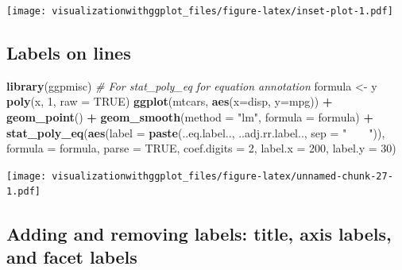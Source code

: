 \documentclass[]{krantz}
\makeatletter
\newenvironment{Shaded}{\begin{snugshade}}{\end{snugshade}}
\newcommand{\CommentTok}[1]{\textcolor[rgb]{0.56,0.35,0.01}{\textit{#1}}}
\newcommand{\DataTypeTok}[1]{\textcolor[rgb]{0.13,0.29,0.53}{#1}}
\newcommand{\DecValTok}[1]{\textcolor[rgb]{0.00,0.00,0.81}{#1}}
\newcommand{\KeywordTok}[1]{\textcolor[rgb]{0.13,0.29,0.53}{\textbf{#1}}}
\newcommand{\NormalTok}[1]{#1}
\newcommand{\OperatorTok}[1]{\textcolor[rgb]{0.81,0.36,0.00}{\textbf{#1}}}
\newcommand{\OtherTok}[1]{\textcolor[rgb]{0.56,0.35,0.01}{#1}}
\newcommand{\StringTok}[1]{\textcolor[rgb]{0.31,0.60,0.02}{#1}}
\newenvironment{kframe}{%
\medskip{}
\setlength{\fboxsep}{.8em}
 \def\at@end@of@kframe{}%
 \ifinner\ifhmode%
  \def\at@end@of@kframe{\end{minipage}}%
  \begin{minipage}{\columnwidth}%
 \fi\fi%
 \def\FrameCommand##1{\hskip\@totalleftmargin \hskip-\fboxsep
 \colorbox{shadecolor}{##1}\hskip-\fboxsep
     \hskip-\linewidth \hskip-\@totalleftmargin \hskip\columnwidth}%
 \MakeFramed {\advance\hsize-\width
   \@totalleftmargin\z@ \linewidth\hsize
   \@setminipage}}%
 {\par\unskip\endMakeFramed%
 \at@end@of@kframe}
\renewenvironment{Shaded}{\begin{kframe}}{\end{kframe}}
\makeatother
\begin{document}
\texttt{[image: visualizationwithggplot\_files/figure-latex/inset-plot-1.pdf]}

\hypertarget{labels-on-lines}{%
\subsection{Labels on lines}\label{labels-on-lines}}

\begin{Shaded}
\begin{Highlighting}[]
\KeywordTok{library}\NormalTok{(ggpmisc) }\CommentTok{# For stat_poly_eq for equation annotation  }
\NormalTok{formula <-}\StringTok{ }\NormalTok{y }\OperatorTok{~}\StringTok{ }\KeywordTok{poly}\NormalTok{(x, }\DecValTok{1}\NormalTok{, }\DataTypeTok{raw =} \OtherTok{TRUE}\NormalTok{)}
\KeywordTok{ggplot}\NormalTok{(mtcars, }\KeywordTok{aes}\NormalTok{(}\DataTypeTok{x=}\NormalTok{disp, }\DataTypeTok{y=}\NormalTok{mpg)) }\OperatorTok{+}\StringTok{ }
\StringTok{    }\KeywordTok{geom_point}\NormalTok{() }\OperatorTok{+}\StringTok{  }
\StringTok{    }\KeywordTok{geom_smooth}\NormalTok{(}\DataTypeTok{method =} \StringTok{"lm"}\NormalTok{, }\DataTypeTok{formula =}\NormalTok{ formula) }\OperatorTok{+}\StringTok{     }\KeywordTok{stat_poly_eq}\NormalTok{(}\KeywordTok{aes}\NormalTok{(}\DataTypeTok{label =}  \KeywordTok{paste}\NormalTok{(..eq.label.., ..adj.rr.label.., }
        \DataTypeTok{sep =} \StringTok{"~~~~"}\NormalTok{)), }\DataTypeTok{formula =}\NormalTok{ formula, }\DataTypeTok{parse =} \OtherTok{TRUE}\NormalTok{, }\DataTypeTok{coef.digits =} \DecValTok{2}\NormalTok{, }\DataTypeTok{label.x =} \DecValTok{200}\NormalTok{, }\DataTypeTok{label.y =} \DecValTok{30}\NormalTok{)}
\end{Highlighting}
\end{Shaded}

\texttt{[image: visualizationwithggplot\_files/figure-latex/unnamed-chunk-27-1.pdf]}

\hypertarget{AddingRemovingLabels}{%
\subsection{Adding and removing labels: title, axis labels, and facet labels}\label{AddingRemovingLabels}}
\end{document}
